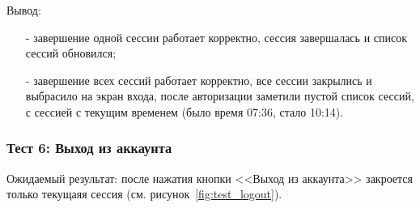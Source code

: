 



Вывод:
\begin{itemize}
    \item[-] завершение одной сессии работает корректно, сессия завершалась и список сессий обновился;
    \item[-] завершение всех сессий работает корректно, все сессии закрылись и выбрасило на экран входа,
    после авторизации заметили пустой список сессий, с сессией с текущим временем (было время 07:36, стало 10:14).
\end{itemize}

\subsubsection*{Тест 6: Выход из аккаунта}

Ожидаемый результат: после нажатия кнопки <<Выход из аккаунта>> закроется только текущаяя сессия (см. рисунок~\ref{fig:test_logout}).




